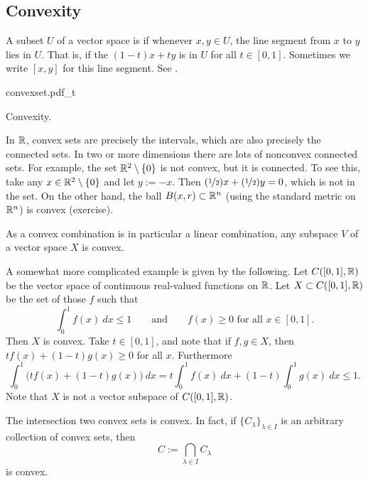 \subsection{Convexity}

A subset $U$ of a vector space is \emph{}
if whenever $x,y \in U$, the line segment from
$x$ to $y$ lies in $U$.  That is, if the \emph{}
$(1-t)x+ty$ is in $U$ for all $t \in [0,1]$.
Sometimes we write $[x,y]$ for this line segment.
See .

\begin{myfigureht}
{convexset.pdf_t}
\caption{Convexity.\label{mv:convexcomb}}
\end{myfigureht}

In ${\mathbb{R}}$, convex sets are precisely the intervals, which are
also precisely the connected sets.
In two or more dimensions
there are lots of nonconvex connected sets.  For example,
the set ${\mathbb{R}}^2 \setminus \{0\}$ is not convex, but it is connected.  To see
this, take any $x \in {\mathbb{R}}^2 \setminus \{0\}$ and let $y:=-x$.
Then $(\nicefrac{1}{2})x + (\nicefrac{1}{2})y = 0$, which is not in the set.
On the other hand, the ball $B(x,r) \subset {\mathbb{R}}^n$ (using the standard metric
on ${\mathbb{R}}^n$)
is convex (exercise).

\begin{example}
As a convex combination is in particular a linear combination,
any subspace $V$ of a vector space $X$ is convex.
\end{example}

\begin{example}
A somewhat more complicated example is given by the following.  Let
$C([0,1],{\mathbb{R}})$ be the vector space of continuous real-valued functions on ${\mathbb{R}}$.
Let $X \subset C([0,1],{\mathbb{R}})$ be the set of those $f$ such that
\begin{equation*}
\int_0^1 f(x)~dx \leq 1 \qquad \text{and} \qquad
f(x) \geq 0 \text{ for all $x \in [0,1]$} .
\end{equation*}
Then $X$ is convex.  Take $t \in [0,1]$, and note that if $f,g \in X$,
then $t f(x) + (1-t) g(x) \geq 0$ for all $x$.  Furthermore
\begin{equation*}
\int_0^1 \bigl(tf(x) + (1-t)g(x)\bigr) ~dx
=
t \int_0^1 f(x) ~dx
+ (1-t)\int_0^1 g(x) ~dx \leq 1 .
\end{equation*}
Note that $X$ is not a vector subspace of $C([0,1],{\mathbb{R}})$.
\end{example}

\begin{prop}
The intersection two convex sets is convex.  In fact,
if $\{ C_\lambda \}_{\lambda \in I}$ is
an arbitrary collection of convex sets, then
\begin{equation*}
C := \bigcap_{\lambda \in I} C_\lambda
\end{equation*}
is convex.
\end{prop}

